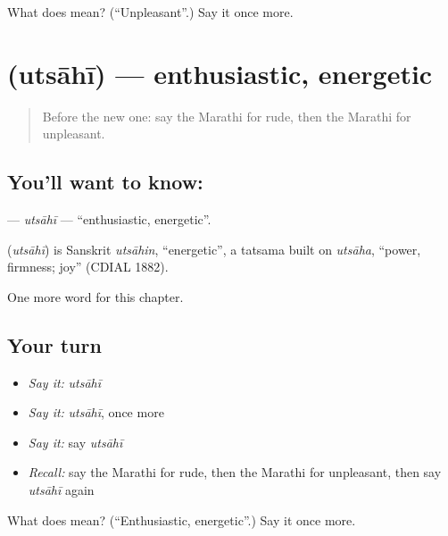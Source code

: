 \begin{tcolorbox}[breakable,colback=teal!4,colframe=teal!35!black,title={Before you move on}]
What does  mean? (\textquotedblleft{}Unpleasant\textquotedblright{}.) Say it once more.
\end{tcolorbox}
\section[\texorpdfstring{\mr{उत्साही} (utsāhī)}{उत्साही (utsāhī)}]{ (utsāhī) — enthusiastic, energetic}

\label{lesson:MR-C174-utsahi}



\begin{quote}
Before the new one: say the Marathi for rude, then the Marathi for unpleasant.
\end{quote}

\subsection*{You'll want to know: }
\textbf{} — \emph{utsāhī} — \textquotedblleft{}enthusiastic, energetic\textquotedblright{}.

\begin{cousinweb}
\textbf{} (\emph{utsāhī}) is Sanskrit \emph{utsāhin}, \textquotedblleft{}energetic\textquotedblright{}, a tatsama built on \emph{utsāha}, \textquotedblleft{}power, firmness; joy\textquotedblright{} (CDIAL 1882).
\end{cousinweb}

\begin{grammarlens}[title={What you've built}]
One more word for this chapter.
\end{grammarlens}

\subsection*{Your turn}
\begin{itemize}
\raggedright
  \item \emph{Say it:} \emph{utsāhī}
  \item \emph{Say it:} \emph{utsāhī}, once more
  \item \emph{Say it:} say \emph{utsāhī}
  \item \emph{Recall:} say the Marathi for rude, then the Marathi for unpleasant, then say \emph{utsāhī} again
\end{itemize}

\begin{tcolorbox}[breakable,colback=teal!4,colframe=teal!35!black,title={Before you move on}]
What does  mean? (\textquotedblleft{}Enthusiastic, energetic\textquotedblright{}.) Say it once more.
\end{tcolorbox}
